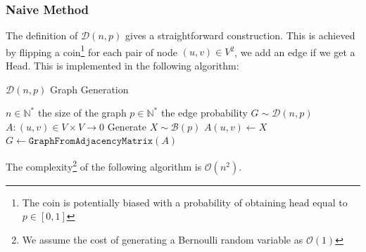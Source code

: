 \subsubsection{Naive Method}
The definition of $\mathcal{D}(n,p)$ gives a straightforward construction. \newline
This is achieved by flipping a coin\footnote{The coin is potentially biased with a probability of obtaining head equal to $p\in [0,1]$} for each pair of node $(u,v)\in V^2$, we add an edge if we get a Head. 
\newline This is implemented in the following algorithm:
\begin{algorithm}
	\caption{$\mathcal{D}(n,p)$ Graph Generation}\label{alg:Dnp_Naive}
	\begin{algorithmic}
		\Require $n\in\mathbb{N}^*$ the size of the graph
		\Require $p\in\mathbb{N}^*$ the edge probability 
		\Ensure $G\sim \mathcal{D}(n,p)$  
		\State $A:(u,v)\in V\times V\rightarrow 0$
		\State Generate $X\sim \mathcal{B}(p)$
		\State $A(u,v)\leftarrow X$
		\EndFor
		\EndFor
		\State \Return $G\leftarrow \texttt{GraphFromAdjacencyMatrix}(A)$
	\end{algorithmic}
\end{algorithm}
\FloatBarrier
The complexity\footnote{We assume the cost of generating a Bernoulli random variable as $\mathcal{O}(1)$} of the following algorithm is $\mathcal{O}(n^2).$
